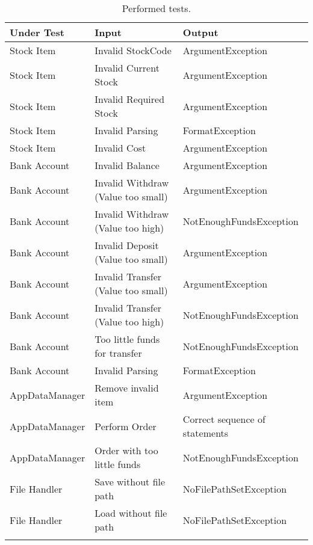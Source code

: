 \begin{longtable}{X X X}
\hline Under Test & Input & Output \\ 
\hline
\hline Stock Item & Invalid StockCode & ArgumentException \\ 
\hline Stock Item & Invalid Current Stock & ArgumentException \\ 
\hline Stock Item & Invalid Required Stock & ArgumentException \\ 
\hline Stock Item & Invalid Parsing & FormatException \\ 
\hline Stock Item & Invalid Cost & ArgumentException \\ 
\hline Bank Account & Invalid Balance & ArgumentException \\ 
\hline Bank Account & Invalid Withdraw (Value too small)& ArgumentException \\
\hline Bank Account & Invalid Withdraw (Value too high)& NotEnoughFundsException \\
\hline Bank Account & Invalid Deposit (Value too small) & ArgumentException \\
\hline Bank Account & Invalid Transfer (Value too small) & ArgumentException \\
\hline Bank Account & Invalid Transfer (Value too high)& NotEnoughFundsException \\
\hline Bank Account & Too little funds for transfer & NotEnoughFundsException \\
\hline Bank Account & Invalid Parsing & FormatException \\
\hline AppDataManager & Remove invalid item & ArgumentException \\
\hline AppDataManager & Perform Order & Correct sequence of statements \\
\hline AppDataManager & Order with too little funds & NotEnoughFundsException \\
\hline File Handler & Save without file path & NoFilePathSetException \\
\hline File Handler & Load without file path & NoFilePathSetException \\
\caption{Performed tests.}
\end{longtable} 